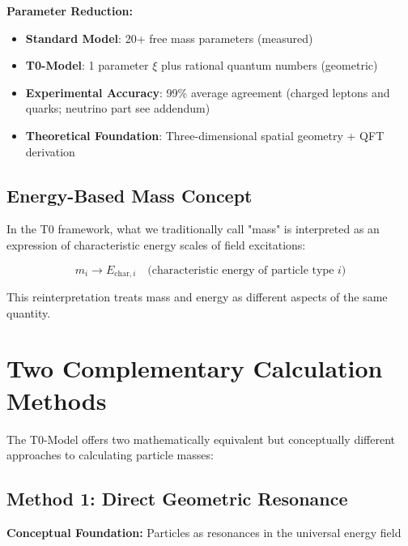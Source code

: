 	\begin{tcolorbox}[colback=green!5!white,colframe=green!75!black,title=Parameter Reduction for Masses]
		\textbf{Parameter Reduction:}
		\begin{itemize}
			\item \textbf{Standard Model}: 20+ free mass parameters (measured)
			\item \textbf{T0-Model}: 1 parameter $\xi$ plus rational quantum numbers (geometric)
			\item \textbf{Experimental Accuracy}: 99\% average agreement (charged leptons and quarks; neutrino part see addendum)
			\item \textbf{Theoretical Foundation}: Three-dimensional spatial geometry + QFT derivation
		\end{itemize}
	\end{tcolorbox}
	
	\subsection{Energy-Based Mass Concept}
	\label{subsec:energy_based_mass}
	
	In the T0 framework, what we traditionally call "mass" is interpreted as an expression of characteristic energy scales of field excitations:
	
	\begin{equation}
		\boxed{m_i \rightarrow E_{\text{char},i} \quad \text{(characteristic energy of particle type } i\text{)}}
		\label{eq:mass_to_energy}
	\end{equation}
	
	This reinterpretation treats mass and energy as different aspects of the same quantity.
	
	\section{Two Complementary Calculation Methods}
	\label{sec:two_calculation_methods}
	
	The T0-Model offers two mathematically equivalent but conceptually different approaches to calculating particle masses:
	
	\subsection{Method 1: Direct Geometric Resonance}
	\label{subsec:direct_geometric_method}
	
	\textbf{Conceptual Foundation:} Particles as resonances in the universal energy field
	
